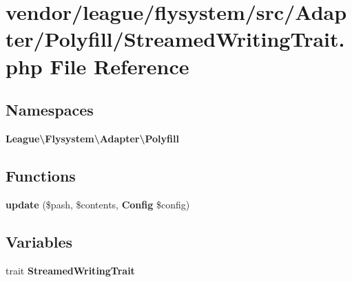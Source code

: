 \section{vendor/league/flysystem/src/\+Adapter/\+Polyfill/\+Streamed\+Writing\+Trait.php File Reference}
\label{_streamed_writing_trait_8php}
\subsection*{Namespaces}
\begin{DoxyCompactItemize}
\item 
 {\bf League\textbackslash{}\+Flysystem\textbackslash{}\+Adapter\textbackslash{}\+Polyfill}
\end{DoxyCompactItemize}
\subsection*{Functions}
\begin{DoxyCompactItemize}
\item 
{\bf update} (\$pash, \$contents, {\bf Config} \$config)
\end{DoxyCompactItemize}
\subsection*{Variables}
\begin{DoxyCompactItemize}
\item 
trait {\bf Streamed\+Writing\+Trait}
\end{DoxyCompactItemize}
